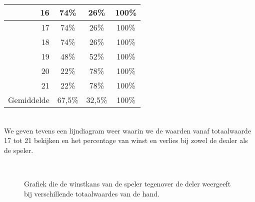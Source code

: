 \documentclass[11pt, final, journal, a4paper]{IEEEtran}
\begin{document}
\begin{table}[h]
\begin{tabular}{r||c|c||c}
\multicolumn{1}{r||}{16} 									& 74\%           & 26\%           	& 100\%  \\ \hline
\multicolumn{1}{r||}{17} 									& 74\%           & 26\%           	& 100\%  \\ \hline
\multicolumn{1}{r||}{18} 									& 74\%           & 26\%           	& 100\%  \\ \hline
\multicolumn{1}{r||}{19} 									& 48\%           & 52\%           	& 100\%  \\ \hline
\multicolumn{1}{r||}{20} 									& 22\%           & 78\%           	& 100\%  \\ \hline
\multicolumn{1}{r||}{21} 									& 22\%           & 78\%           	& 100\%  \\ \hline \hline
\multicolumn{1}{r||}{Gemiddelde}					& 67,5\%				 & 32,5\%				    & 100\%	 \\ 
\end{tabular}
\end{table}
\\
We geven tevens een lijndiagram weer waarin we de waarden vanaf totaalwaarde 17 tot 21 bekijken en het percentage van winst en verlies bij zowel de dealer als de speler. 
\begin{figure}[h]%
\begin{center}
\\
\caption{Grafiek die de winstkans van de speler tegenover de deler weergeeft bij verschillende totaalwaardes van de hand.}%
\end{center}
\end{figure}
\\
\end{document}
